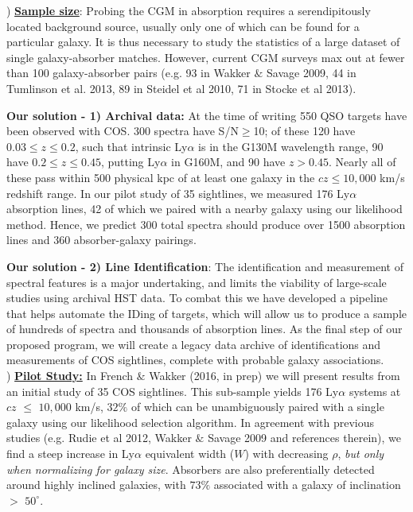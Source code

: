 \documentclass[12pt]{article}
\begin{document}
) \textbf{\underline{Sample size}}: Probing the CGM in absorption requires a serendipitously located background source, usually only one of which can be found for a particular galaxy. It is thus necessary to study the statistics of a large dataset of single galaxy-absorber matches. However, current CGM surveys max out at fewer than 100 galaxy-absorber pairs (e.g. 93 in Wakker $\&$ Savage 2009, 44 in Tumlinson et al. 2013, 89 in Steidel et al 2010, 71 in Stocke et al 2013).

\textbf{Our solution - 1) Archival data:} At the time of writing 550 QSO targets have been observed with COS. 300 spectra have S/N$\geq$10; of these 120 have $0.03\leq z \leq 0.2$, such that intrinsic Ly$\alpha$ is in the G130M wavelength range, 90 have $0.2\leq z \leq 0.45$, putting Ly$\alpha$ in G160M, and 90 have $z > 0.45$. Nearly all of these pass within 500 physical kpc of at least one galaxy in the $cz \leq 10,000$ km/s redshift range. In our pilot study of 35 sightlines, we measured 176 Ly$\alpha$ absorption lines, 42 of which we paired with a nearby galaxy using our likelihood method. Hence, we predict 300 total spectra should produce over 1500 absorption lines and 360 absorber-galaxy pairings.

\textbf{Our solution - 2) Line Identification}: The identification and measurement of spectral features is a major undertaking, and limits the viability of large-scale studies using archival HST data. To combat this we have developed a pipeline that helps automate the IDing of targets, which will allow us to produce a sample of hundreds of spectra and thousands of absorption lines. As the final step of our proposed program, we will create a legacy data archive of identifications and measurements of COS sightlines, complete with probable galaxy associations.\\

) \textbf{\underline{Pilot Study:}} In French $\&$ Wakker (2016, in prep) we will present results from an initial study of 35 COS sightlines. This sub-sample yields 176 Ly$\alpha$ systems at $cz$ $\leq$ $10,000$ km/s, $32\%$ of which can be unambiguously paired with a single galaxy using our likelihood selection algorithm. In agreement with previous studies (e.g. Rudie et al 2012, Wakker $\&$ Savage 2009 and references therein), we find a steep increase in Ly$\alpha$ equivalent width ($W$) with decreasing $\rho$, \textit{but only when normalizing for galaxy size}. Absorbers are also preferentially detected around highly inclined galaxies, with $73\%$ associated with a galaxy of inclination $>$ $50^{\circ}$. 
\end{document}
